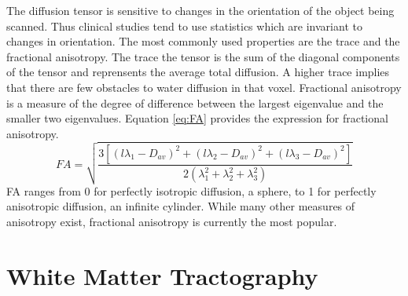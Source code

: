 The diffusion tensor is sensitive to changes in the orientation of the object being scanned. Thus clinical studies tend to use statistics which are invariant to changes in orientation.  The most commonly used properties are the trace and the fractional anisotropy.  The trace the tensor is the sum of the diagonal components of the tensor and reprensents the average total diffusion.  A higher trace implies that there are few obstacles to water diffusion in that voxel.  Fractional anisotropy is a measure of the degree of difference between the largest eigenvalue and the smaller two eigenvalues.  Equation \ref{eq:FA} provides the expression for fractional anisotropy.
\begin{equation} \label{eq:FA}
FA=\sqrt{\frac{3[(l\lambda_1-D_{av})^2 + (l\lambda_2-D_{av})^2 + (l\lambda_3-D_{av})^2]}
{2(\lambda_1^2+\lambda_2^2+\lambda_3^2)}}
\end{equation}
FA ranges from 0 for perfectly isotropic diffusion, a sphere, to 1 for perfectly anisotropic diffusion, an infinite cylinder.  While many other measures of anisotropy exist, fractional anisotropy is currently the most popular.


\section{White Matter Tractography}



